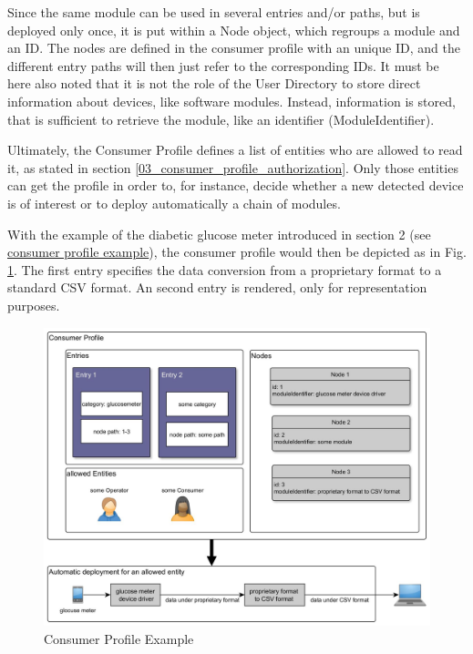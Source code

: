 Since the same module can be used in several entries and/or paths, but is deployed only once, it is put within a Node object, which regroups a module and an ID. The nodes are defined in the consumer profile with an unique ID, and the different entry paths will then just refer to the corresponding IDs. It must be here also noted that it is not the role of the User Directory to store direct information about devices, like software modules. Instead, information is stored, that is sufficient to retrieve the module, like an identifier (ModuleIdentifier).

Ultimately, the Consumer Profile defines a list of entities who are allowed to read it, as stated in section \ref{03_consumer_profile_authorization}. Only those entities can get the profile in order to, for instance, decide whether a new detected device is of interest or to deploy automatically a chain of modules.

With the example of the diabetic glucose meter introduced in section 2 (see \hyperref[02_consumer_profile_example]{consumer profile example}), the consumer profile would then be depicted as in Fig. \ref{fig:consumer_profile_example}. The first entry specifies the data conversion from a proprietary format to a standard CSV format. An second entry is rendered, only for representation purposes.

\begin{figure}[!hpbt]
	\centering
	\caption{Consumer Profile Example}
	\label{fig:consumer_profile_example}
	\includegraphics[width=1\textwidth]{images/consumer_profile_example}
\end{figure}

